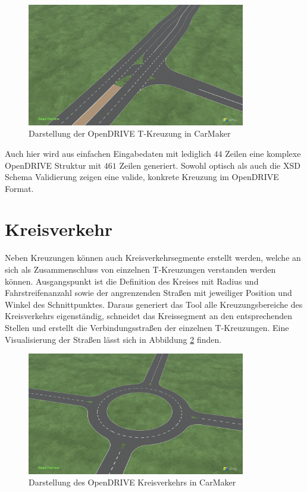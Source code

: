 \begin{figure}[!h]
\flushleft
\center \includegraphics[width=0.85\textwidth]{fig/junction6.png}
\caption{Darstellung der OpenDRIVE T-Kreuzung in CarMaker}
\label{abb7}
\end{figure}

Auch hier wird aus einfachen Eingabedaten mit lediglich \(44\) Zeilen eine komplexe OpenDRIVE Struktur mit \(461\) Zeilen generiert. Sowohl optisch als auch die XSD Schema Validierung zeigen eine valide, konkrete Kreuzung im OpenDRIVE Format.

\section{Kreisverkehr}
Neben Kreuzungen können auch Kreisverkehrsegmente erstellt werden, welche an sich als Zusammenschluss von einzelnen T-Kreuzungen verstanden werden können. Ausgangspunkt ist die Definition des Kreises mit Radius und Fahrstreifenanzahl sowie der angrenzenden Straßen mit jeweiliger Position und Winkel des Schnittpunktes. Daraus generiert das Tool alle Kreuzungsbereiche des Kreisverkehrs eigenständig, schneidet das Kreissegment an den entsprechenden Stellen und erstellt die Verbindungsstraßen der einzelnen T-Kreuzungen. Eine Visualisierung der Straßen lässt sich in Abbildung \ref{abb8} finden.

\begin{figure}[!h]
\flushleft
\center \includegraphics[width=0.85\textwidth]{fig/roundabout.png}
\caption{Darstellung des OpenDRIVE Kreisverkehrs in CarMaker}
\label{abb8}
\end{figure}

